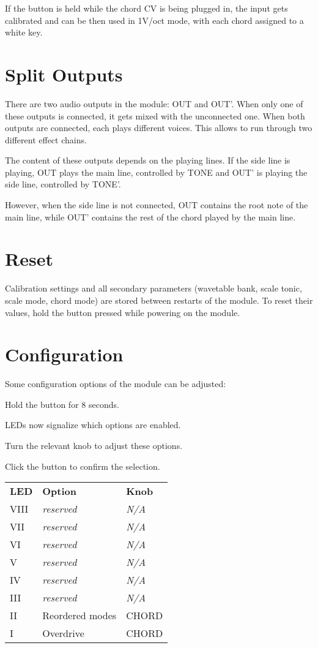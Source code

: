 \documentclass[10pt,nofoldmark,nocombine]{leaflet} %
\newenvironment{packed_enumerate}{
\begin{enumerate}
  \setlength{\itemsep}{1pt}
  \setlength{\parskip}{0pt}
  \setlength{\parsep}{0pt}
}{\end{enumerate}}
\begin{document}
If the button is held while the chord CV is being plugged in, the input gets calibrated and can be then used in 1V/oct mode, with each chord assigned to a white key.

\section{Split Outputs}

There are two audio outputs in the module: OUT and OUT'. When only one of these outputs is connected, it gets mixed with the unconnected one. When both outputs are connected, each plays different voices. This allows to run through two different effect chains.

The content of these outputs depends on the playing lines. If the side line is playing, OUT plays the main line, controlled by TONE and OUT' is playing the side line, controlled by TONE'.

However, when the side line is not connected, OUT contains the root note of the main line, while OUT' contains the rest of the chord played by the main line.

\section{Reset}

Calibration settings and all secondary parameters (wavetable bank, scale tonic, scale mode, chord mode) are stored between restarts of the module. To reset their values, hold the button pressed while powering on the module.

\section{Configuration}

Some configuration options of the module can be adjusted:

\begin{packed_enumerate}
  \item Hold the button for 8 seconds.
  \item LEDs now signalize which options are enabled.
  \item Turn the relevant knob to adjust these options.
  \item Click the button to confirm the selection.
\end{packed_enumerate}

\begin{tabular}{@{}lll@{}}
  \textbf{LED} & \textbf{Option} & \textbf{Knob} \\
  VIII & \textit{reserved} & \textit{N/A} \\
  VII  & \textit{reserved} & \textit{N/A} \\
  VI   & \textit{reserved} & \textit{N/A} \\
  V    & \textit{reserved} & \textit{N/A} \\
  IV   & \textit{reserved} & \textit{N/A} \\
  III  & \textit{reserved} & \textit{N/A} \\
  II   & Reordered modes & CHORD \\
  I    & Overdrive & CHORD
\end{tabular}
\end{document}
